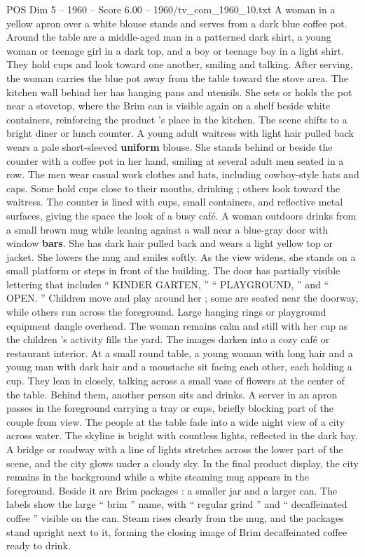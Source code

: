 \begin{textsample}{POS Dim 5 – 1960 – Score 6.00 – 1960/tv\_com\_1960\_10.txt}
A woman in a yellow apron over a white blouse stands and serves from a dark blue coffee pot.
Around the table are a middle-aged man in a patterned dark shirt, a young woman or teenage girl in a dark top, and a boy or teenage boy in a light shirt.
They hold cups and look toward one another, smiling and talking.
After serving, the woman carries the blue pot away from the table toward the stove area.
The kitchen wall behind her has hanging pans and utensils.
She sets or holds the pot near a stovetop, where the Brim can is visible again on a shelf beside white containers, reinforcing the product ’s place in the kitchen.
The scene shifts to a bright diner or lunch counter.
A young adult waitress with light hair pulled back wears a pale short-sleeved \textbf{uniform} blouse.
She stands behind or beside the counter with a coffee pot in her hand, smiling at several adult men seated in a row.
The men wear casual work clothes and hats, including cowboy-style hats and caps.
Some hold cups close to their mouths, drinking ; others look toward the waitress.
The counter is lined with cups, small containers, and reflective metal surfaces, giving the space the look of a busy café.
A woman outdoors drinks from a small brown mug while leaning against a wall near a blue-gray door with window \textbf{bars}.
She has dark hair pulled back and wears a light yellow top or jacket.
She lowers the mug and smiles softly.
As the view widens, she stands on a small platform or steps in front of the building.
The door has partially visible lettering that includes “ KINDER GARTEN, ” “ PLAYGROUND, ” and “ OPEN. ” Children move and play around her ; some are seated near the doorway, while others run across the foreground.
Large hanging rings or playground equipment dangle overhead.
The woman remains calm and still with her cup as the children ’s activity fills the yard.
The images darken into a cozy café or restaurant interior.
At a small round table, a young woman with long hair and a young man with dark hair and a moustache sit facing each other, each holding a cup.
They lean in closely, talking across a small vase of flowers at the center of the table.
Behind them, another person sits and drinks.
A server in an apron passes in the foreground carrying a tray or cups, briefly blocking part of the couple from view.
The people at the table fade into a wide night view of a city across water.
The skyline is bright with countless lights, reflected in the dark bay.
A bridge or roadway with a line of lights stretches across the lower part of the scene, and the city glows under a cloudy sky.
In the final product display, the city remains in the background while a white steaming mug appears in the foreground.
Beside it are Brim packages : a smaller jar and a larger can.
The labels show the large “ brim ” name, with “ regular grind ” and “ decaffeinated coffee ” visible on the can.
Steam rises clearly from the mug, and the packages stand upright next to it, forming the closing image of Brim decaffeinated coffee ready to drink.

\end{textsample}
